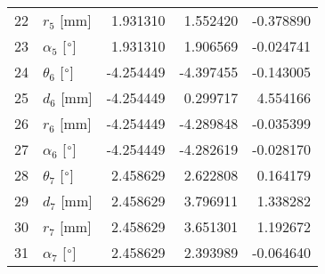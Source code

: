 \documentclass{standalone}%
\begin{document}
\begin{tabular}{llrrr}
22 &              $r_{5}$ [mm] &  1.931310 &   1.552420 &  -0.378890 \\
23 &  $\alpha_{5}$ [$\degree$] &  1.931310 &   1.906569 &  -0.024741 \\
24 &  $\theta_{6}$ [$\degree$] & -4.254449 &  -4.397455 &  -0.143005 \\
25 &              $d_{6}$ [mm] & -4.254449 &   0.299717 &   4.554166 \\
26 &              $r_{6}$ [mm] & -4.254449 &  -4.289848 &  -0.035399 \\
27 &  $\alpha_{6}$ [$\degree$] & -4.254449 &  -4.282619 &  -0.028170 \\
28 &  $\theta_{7}$ [$\degree$] &  2.458629 &   2.622808 &   0.164179 \\
29 &              $d_{7}$ [mm] &  2.458629 &   3.796911 &   1.338282 \\
30 &              $r_{7}$ [mm] &  2.458629 &   3.651301 &   1.192672 \\
31 &  $\alpha_{7}$ [$\degree$] &  2.458629 &   2.393989 &  -0.064640 \\
\bottomrule
\end{tabular}
%
\end{document}
